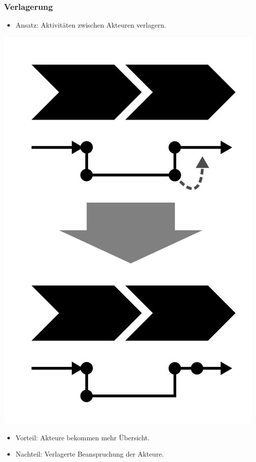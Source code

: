 \documentclass[xcolor=dvipsnames]{beamer}
\begin{document}
 \begin{frame}
  \frametitle{Verlagerung}
    \begin{itemize}
    \item Ansatz: Aktivitäten zwischen Akteuren verlagern.
  \end{itemize}
  \centerline{\includegraphics[scale=2.5]{4_6_5.png}}
  \begin{itemize}
    \item Vorteil: Akteure bekommen mehr Übersicht.
    \item Nachteil: Verlagerte Beanspruchung der Akteure.
  \end{itemize}
 \end{frame}
\end{document}
